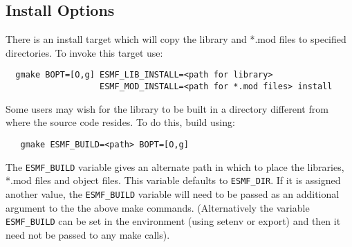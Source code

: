 

\subsection{Install Options}
\label{BuildOptions}

There is an install target which will copy the library and *.mod files to
specified directories.  To invoke this target use:
\begin{verbatim}
  gmake BOPT=[O,g] ESMF_LIB_INSTALL=<path for library>
                   ESMF_MOD_INSTALL=<path for *.mod files> install 
\end{verbatim}

Some users may wish for the library to be built in a directory different from 
where the source code resides.  To do this, build using:
\begin{verbatim}
   gmake ESMF_BUILD=<path> BOPT=[O,g]
\end{verbatim}

The {\tt ESMF\_BUILD} variable gives an alternate path in which to
place the libraries, *.mod files and object files.  This variable
defaults to {\tt ESMF\_DIR}.  If it is assigned another value, the
{\tt ESMF\_BUILD} variable will need to be passed as an additional
argument to the the above make commands.  (Alternatively the variable
{\tt ESMF\_BUILD} can be set in the environment (using setenv or
export) and then it need not be passed to any make calls).
